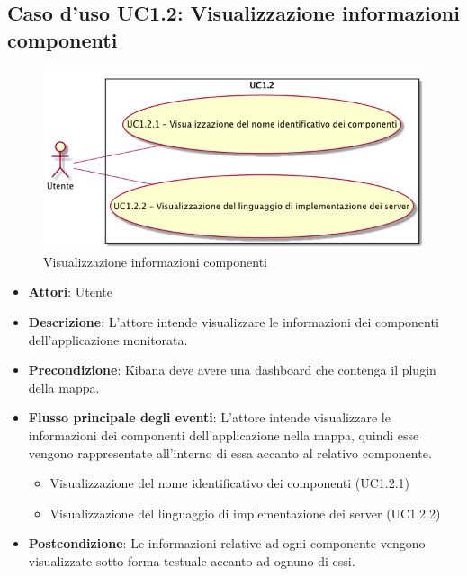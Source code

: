 \subsection{Caso d'uso UC1.2: Visualizzazione informazioni componenti}
\begin{figure} [H]
	\centering
	\includegraphics[scale=0.45]{./UC/UC1-2.png}
	\caption{Visualizzazione informazioni componenti}\label{}
\end{figure}
\begin{itemize}
	\item \textbf{Attori}: Utente
	\item \textbf{Descrizione}: L'attore intende visualizzare le informazioni dei componenti dell'applicazione monitorata.
	\item \textbf{Precondizione}: Kibana deve avere una dashboard che contenga il plugin della mappa.
	\item \textbf{Flusso principale degli eventi}: L'attore intende visualizzare le informazioni dei componenti dell'applicazione nella mappa, quindi esse vengono rappresentate all'interno di essa accanto al relativo componente.
	\begin{itemize}
		\item Visualizzazione del nome identificativo dei componenti (UC1.2.1)
		\item Visualizzazione del linguaggio di implementazione dei server (UC1.2.2)
	\end{itemize}
	\item \textbf{Postcondizione}: Le informazioni relative ad ogni componente vengono visualizzate sotto forma testuale accanto ad ognuno di essi.
\end{itemize}

 \hypertarget{UC1.2.1}{}
